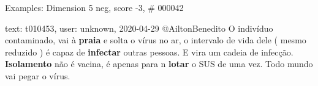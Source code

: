 \begin{frame}{Examples: Dimension 5 neg, score -3, \# 000042}
\footnotesize
\begin{alertblock}{text: t010453, user: unknown, 2020-04-29}
@AiltonBenedito O indivíduo contaminado, vai à \textbf{praia} e solta o vírus 
no ar, o intervalo de vida dele ( mesmo reduzido ) é capaz de \textbf{infectar} 
outras pessoas. E vira um cadeia de infecção. \textbf{Isolamento} não é vacina, 
é apenas para n \textbf{lotar} o SUS de uma vez. Todo mundo vai pegar o vírus. 
\end{alertblock}
\end{frame}

